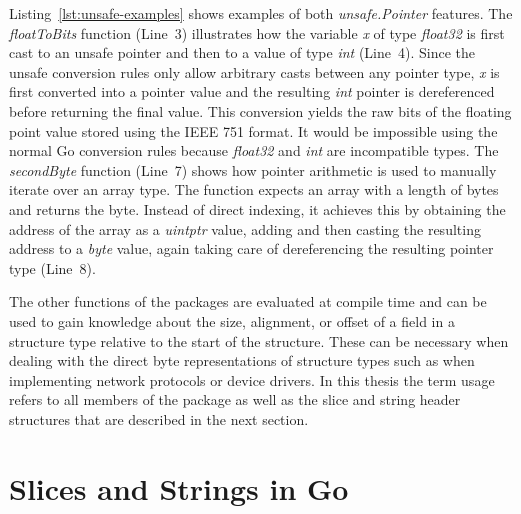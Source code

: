 Listing~\ref{lst:unsafe-examples} shows examples of both \textit{unsafe.Pointer} features.
The \textit{floatToBits} function (Line~3) illustrates how the variable \textit{x} of type \textit{float32} is first
cast to an unsafe pointer and then to a value of type \textit{int} (Line~4).
Since the unsafe conversion rules only allow arbitrary casts between any pointer type, \textit{x} is first converted
into a pointer value and the resulting \textit{int} pointer is dereferenced before returning the final value.
This conversion yields the raw bits of the floating point value stored using the IEEE 751 format.
It would be impossible using the normal Go conversion rules because \textit{float32} and \textit{int} are incompatible
types.
The \textit{secondByte} function (Line~7) shows how pointer arithmetic is used to manually iterate over an array type.
The function expects an array with a length of  bytes and returns the  byte.
Instead of direct indexing, it achieves this by obtaining the address of the array as a \textit{uintptr} value, adding
 and then casting the resulting address to a \textit{byte} value, again taking care of dereferencing the
resulting pointer type (Line~8).



The other functions of the \unsafe{} packages are evaluated at compile time and can be used to gain knowledge about
the size, alignment, or offset of a field in a structure type relative to the start of the structure.
These can be necessary when dealing with the direct byte representations of structure types such as when implementing
network protocols or device drivers.
In this thesis the term \unsafe{} usage refers to all members of the \unsafe{} package as well as the slice and string
header structures that are described in the next section.



\section{Slices and Strings in Go}\label{sec:background:slices}

